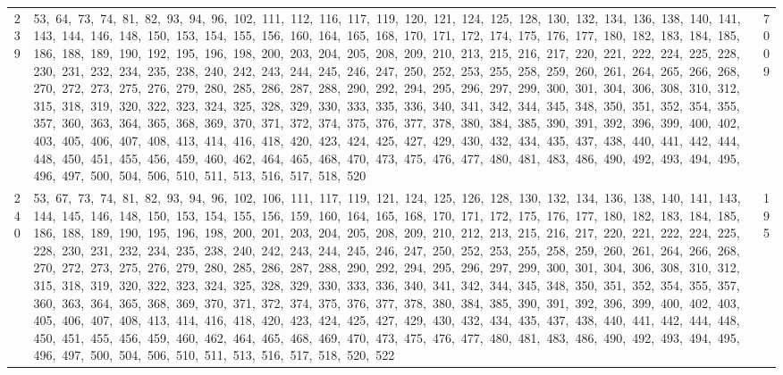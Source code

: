 \begin{longtable}{c|p{}|r}
239 & 53,\ 64,\ 73,\ 74,\ 81,\ 82,\ 93,\ 94,\ 96,\ 102,\ 111,\ 112,\ 116,\ 117,\ 119,\ 120,\ 121,\ 124,\ 125,\ 128,\ 130,\ 132,\ 134,\ 136,\ 138,\ 140,\ 141,\ 143,\ 144,\ 146,\ 148,\ 150,\ 153,\ 154,\ 155,\ 156,\ 160,\ 164,\ 165,\ 168,\ 170,\ 171,\ 172,\ 174,\ 175,\ 176,\ 177,\ 180,\ 182,\ 183,\ 184,\ 185,\ 186,\ 188,\ 189,\ 190,\ 192,\ 195,\ 196,\ 198,\ 200,\ 203,\ 204,\ 205,\ 208,\ 209,\ 210,\ 213,\ 215,\ 216,\ 217,\ 220,\ 221,\ 222,\ 224,\ 225,\ 228,\ 230,\ 231,\ 232,\ 234,\ 235,\ 238,\ 240,\ 242,\ 243,\ 244,\ 245,\ 246,\ 247,\ 250,\ 252,\ 253,\ 255,\ 258,\ 259,\ 260,\ 261,\ 264,\ 265,\ 266,\ 268,\ 270,\ 272,\ 273,\ 275,\ 276,\ 279,\ 280,\ 285,\ 286,\ 287,\ 288,\ 290,\ 292,\ 294,\ 295,\ 296,\ 297,\ 299,\ 300,\ 301,\ 304,\ 306,\ 308,\ 310,\ 312,\ 315,\ 318,\ 319,\ 320,\ 322,\ 323,\ 324,\ 325,\ 328,\ 329,\ 330,\ 333,\ 335,\ 336,\ 340,\ 341,\ 342,\ 344,\ 345,\ 348,\ 350,\ 351,\ 352,\ 354,\ 355,\ 357,\ 360,\ 363,\ 364,\ 365,\ 368,\ 369,\ 370,\ 371,\ 372,\ 374,\ 375,\ 376,\ 377,\ 378,\ 380,\ 384,\ 385,\ 390,\ 391,\ 392,\ 396,\ 399,\ 400,\ 402,\ 403,\ 405,\ 406,\ 407,\ 408,\ 413,\ 414,\ 416,\ 418,\ 420,\ 423,\ 424,\ 425,\ 427,\ 429,\ 430,\ 432,\ 434,\ 435,\ 437,\ 438,\ 440,\ 441,\ 442,\ 444,\ 448,\ 450,\ 451,\ 455,\ 456,\ 459,\ 460,\ 462,\ 464,\ 465,\ 468,\ 470,\ 473,\ 475,\ 476,\ 477,\ 480,\ 481,\ 483,\ 486,\ 490,\ 492,\ 493,\ 494,\ 495,\ 496,\ 497,\ 500,\ 504,\ 506,\ 510,\ 511,\ 513,\ 516,\ 517,\ 518,\ 520 & 7009 \\
240 & 53,\ 67,\ 73,\ 74,\ 81,\ 82,\ 93,\ 94,\ 96,\ 102,\ 106,\ 111,\ 117,\ 119,\ 121,\ 124,\ 125,\ 126,\ 128,\ 130,\ 132,\ 134,\ 136,\ 138,\ 140,\ 141,\ 143,\ 144,\ 145,\ 146,\ 148,\ 150,\ 153,\ 154,\ 155,\ 156,\ 159,\ 160,\ 164,\ 165,\ 168,\ 170,\ 171,\ 172,\ 175,\ 176,\ 177,\ 180,\ 182,\ 183,\ 184,\ 185,\ 186,\ 188,\ 189,\ 190,\ 195,\ 196,\ 198,\ 200,\ 201,\ 203,\ 204,\ 205,\ 208,\ 209,\ 210,\ 212,\ 213,\ 215,\ 216,\ 217,\ 220,\ 221,\ 222,\ 224,\ 225,\ 228,\ 230,\ 231,\ 232,\ 234,\ 235,\ 238,\ 240,\ 242,\ 243,\ 244,\ 245,\ 246,\ 247,\ 250,\ 252,\ 253,\ 255,\ 258,\ 259,\ 260,\ 261,\ 264,\ 266,\ 268,\ 270,\ 272,\ 273,\ 275,\ 276,\ 279,\ 280,\ 285,\ 286,\ 287,\ 288,\ 290,\ 292,\ 294,\ 295,\ 296,\ 297,\ 299,\ 300,\ 301,\ 304,\ 306,\ 308,\ 310,\ 312,\ 315,\ 318,\ 319,\ 320,\ 322,\ 323,\ 324,\ 325,\ 328,\ 329,\ 330,\ 333,\ 336,\ 340,\ 341,\ 342,\ 344,\ 345,\ 348,\ 350,\ 351,\ 352,\ 354,\ 355,\ 357,\ 360,\ 363,\ 364,\ 365,\ 368,\ 369,\ 370,\ 371,\ 372,\ 374,\ 375,\ 376,\ 377,\ 378,\ 380,\ 384,\ 385,\ 390,\ 391,\ 392,\ 396,\ 399,\ 400,\ 402,\ 403,\ 405,\ 406,\ 407,\ 408,\ 413,\ 414,\ 416,\ 418,\ 420,\ 423,\ 424,\ 425,\ 427,\ 429,\ 430,\ 432,\ 434,\ 435,\ 437,\ 438,\ 440,\ 441,\ 442,\ 444,\ 448,\ 450,\ 451,\ 455,\ 456,\ 459,\ 460,\ 462,\ 464,\ 465,\ 468,\ 469,\ 470,\ 473,\ 475,\ 476,\ 477,\ 480,\ 481,\ 483,\ 486,\ 490,\ 492,\ 493,\ 494,\ 495,\ 496,\ 497,\ 500,\ 504,\ 506,\ 510,\ 511,\ 513,\ 516,\ 517,\ 518,\ 520,\ 522 & 195 \\

\end{longtable}
